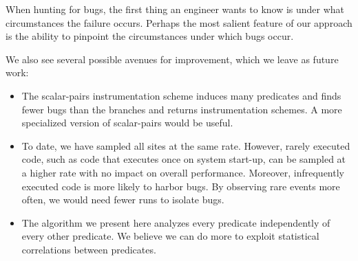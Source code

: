\documentclass[draft]{sig-alternate}
\begin{document}
When hunting for bugs, the first thing an engineer wants to know is
under what circumstances the failure occurs.  Perhaps the most salient
feature of our approach is the ability to pinpoint the circumstances
under which bugs occur.

We also see several possible avenues for improvement, which we leave
as future work:
\begin{itemize}

\item The scalar-pairs instrumentation scheme induces many
predicates and finds fewer bugs than the branches and
returns instrumentation schemes.  A more specialized version of scalar-pairs
would be useful.

\item To date, we have sampled all sites at the same rate.  However,
rarely executed code, such as code that executes once on system start-up,
can be sampled at a higher rate with no impact on overall performance.
Moreover, infrequently executed code is more likely
to harbor bugs.  By observing rare events more often, we would need fewer
runs to isolate bugs.

\item The algorithm we present here analyzes every predicate independently
of every other predicate.  We believe we can do more to exploit
statistical correlations between predicates.


\end{itemize}



\end{document}
